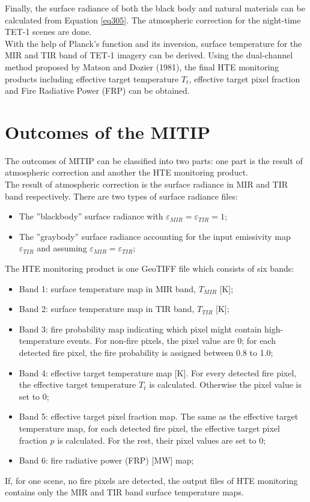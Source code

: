\noindent Finally, the surface radiance of both the black body and natural materials can be calculated from Equation \eqref{eq305}. The atmospheric correction for the night-time TET-1 scenes are done.\\

\noindent With the help of Planck's function and its inversion, surface temperature for the MIR and TIR band of TET-1 imagery can be derived. Using the dual-channel method proposed by Matson and Dozier (1981), the final HTE monitoring products including effective target temperature $T_t$, effective target pixel fraction and Fire Radiative Power (FRP) can be obtained.\\


\section{Outcomes of the MITIP}
The outcomes of MITIP can be classified into two parts: one part is the result of atmospheric correction and another the HTE monitoring product.\\

\noindent The result of atmospheric correction is the surface radiance in MIR and TIR band respectively. There are two types of surface radiance files:
\begin{itemize}
\item The ''blackbody'' surface radiance with $\varepsilon_{MIR} = \varepsilon_{TIR} = 1$;
\item The ''graybody'' surface radiance accounting for the input emissivity map $\varepsilon_{TIR}$ and assuming $\varepsilon_{MIR} = \varepsilon_{TIR}$;
\end{itemize}

\noindent The HTE monitoring product is one GeoTIFF file which consists of six bands:
\begin{itemize}
\item Band 1: surface temperature map in MIR band, $T_{MIR}$ [K];
\item Band 2: surface temperature map in TIR band, $T_{TIR}$ [K];
\item Band 3: fire probability map indicating which pixel might contain high-temperature events. For non-fire pixels, the pixel value are 0; for each detected fire pixel, the fire probability is assigned between 0.8 to 1.0;
\item Band 4: effective target temperature map [K]. For every detected fire pixel, the effective target temperature $T_t$ is calculated.  Otherwise the pixel value is set to 0;
\item Band 5: effective target pixel fraction map. The same as the effective target temperature map, for each detected fire pixel, the effective target pixel fraction $p$ is calculated. For the rest, their pixel values are set to 0;
\item Band 6: fire radiative power (FRP) [MW] map;
\end{itemize}

\noindent If, for one scene, no fire pixels are detected, the output files of HTE monitoring contains only the MIR and TIR band surface temperature maps.\\